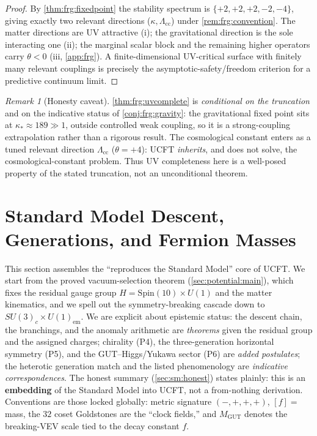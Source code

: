 \documentclass[11pt]{article}
\theoremstyle{plain}
\theoremstyle{definition}
\theoremstyle{remark}
\newtheorem{remark}[theorem]{Remark}
\begin{document}
\begin{proof}
By \autoref{thm:frg:fixedpoint} the stability spectrum is
$\{+2,+2,+2,-2,-4\}$, giving exactly two relevant directions
($\kappa,\Lambda_{\mathrm{cc}}$) under \autoref{rem:frg:convention}. The
matter directions are UV attractive (i); the gravitational direction is
the sole interacting one (ii); the marginal scalar block and the remaining
higher operators carry $\theta<0$ (iii, \autoref{app:frg}). A
finite-dimensional UV-critical surface with finitely many relevant
couplings is precisely the asymptotic-safety/freedom criterion for a
predictive continuum limit.
\end{proof}

\begin{remark}[Honesty caveat]
\label{rem:frg:caveat}
\autoref{thm:frg:uvcomplete} is \emph{conditional on the truncation} and on
the indicative status of \autoref{conj:frg:gravity}: the gravitational
fixed point sits at $\kappa_{\ast}\approx189\gg1$, outside controlled weak
coupling, so it is a strong-coupling extrapolation rather than a rigorous
result. The cosmological constant enters as a tuned relevant direction
$\Lambda_{\mathrm{cc}}$ ($\theta=+4$): UCFT \emph{inherits}, and does not
solve, the cosmological-constant problem. Thus UV completeness here is a
well-posed property of the stated truncation, not an unconditional theorem.
\end{remark}


\section{Standard Model Descent, Generations, and Fermion Masses}
\label{sec:sm:main}
\label{sec:sm}

This section assembles the ``reproduces the Standard Model'' core of UCFT. We start
from the proved vacuum-selection theorem (\autoref{sec:potential:main}), which fixes
the residual gauge group $H = \mathrm{Spin}(10)\times U(1)$ and the matter
kinematics, and we spell out the symmetry-breaking cascade down to
$SU(3)_c\times U(1)_{\mathrm{em}}$. We are explicit about epistemic status: the
descent chain, the branchings, and the anomaly arithmetic are \emph{theorems} given
the residual group and the assigned charges; chirality (P4), the three-generation
horizontal symmetry (P5), and the GUT--Higgs/Yukawa sector (P6) are \emph{added
postulates}; the heterotic generation match and the listed phenomenology are
\emph{indicative correspondences}. The honest summary
(\autoref{sec:sm:honest}) states plainly: this is an \textbf{embedding} of the
Standard Model into UCFT, not a from-nothing derivation. Conventions are those locked
globally: metric signature $(-,+,+,+)$, $[f]=$ mass, the $32$ coset Goldstones are
the ``clock fields,'' and $M_{\mathrm{GUT}}$ denotes the breaking-VEV scale tied to
the decay constant $f$.
\end{document}
